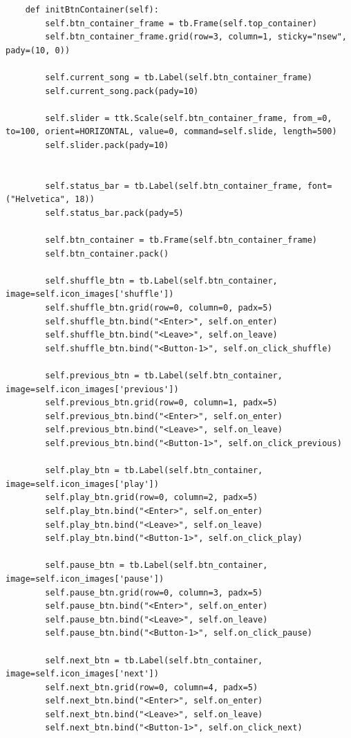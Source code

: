\documentclass[a4paper]{article}
\begin{document}
\begin{mdframed}[hidealllines=true,backgroundcolor=magenta!10]
\begin{lstlisting}
    def initBtnContainer(self):
        self.btn_container_frame = tb.Frame(self.top_container)
        self.btn_container_frame.grid(row=3, column=1, sticky="nsew", pady=(10, 0))

        self.current_song = tb.Label(self.btn_container_frame)
        self.current_song.pack(pady=10)

        self.slider = ttk.Scale(self.btn_container_frame, from_=0, to=100, orient=HORIZONTAL, value=0, command=self.slide, length=500)
        self.slider.pack(pady=10)


        self.status_bar = tb.Label(self.btn_container_frame, font=("Helvetica", 18))
        self.status_bar.pack(pady=5)

        self.btn_container = tb.Frame(self.btn_container_frame)
        self.btn_container.pack()

        self.shuffle_btn = tb.Label(self.btn_container, image=self.icon_images['shuffle'])
        self.shuffle_btn.grid(row=0, column=0, padx=5)
        self.shuffle_btn.bind("<Enter>", self.on_enter)
        self.shuffle_btn.bind("<Leave>", self.on_leave)
        self.shuffle_btn.bind("<Button-1>", self.on_click_shuffle)

        self.previous_btn = tb.Label(self.btn_container, image=self.icon_images['previous'])
        self.previous_btn.grid(row=0, column=1, padx=5)
        self.previous_btn.bind("<Enter>", self.on_enter)
        self.previous_btn.bind("<Leave>", self.on_leave)
        self.previous_btn.bind("<Button-1>", self.on_click_previous)

        self.play_btn = tb.Label(self.btn_container, image=self.icon_images['play'])
        self.play_btn.grid(row=0, column=2, padx=5)
        self.play_btn.bind("<Enter>", self.on_enter)
        self.play_btn.bind("<Leave>", self.on_leave)
        self.play_btn.bind("<Button-1>", self.on_click_play)

        self.pause_btn = tb.Label(self.btn_container, image=self.icon_images['pause'])
        self.pause_btn.grid(row=0, column=3, padx=5)
        self.pause_btn.bind("<Enter>", self.on_enter)
        self.pause_btn.bind("<Leave>", self.on_leave)
        self.pause_btn.bind("<Button-1>", self.on_click_pause)

        self.next_btn = tb.Label(self.btn_container, image=self.icon_images['next'])
        self.next_btn.grid(row=0, column=4, padx=5)
        self.next_btn.bind("<Enter>", self.on_enter)
        self.next_btn.bind("<Leave>", self.on_leave)
        self.next_btn.bind("<Button-1>", self.on_click_next)


\end{lstlisting}
\end{mdframed}
\end{document}
